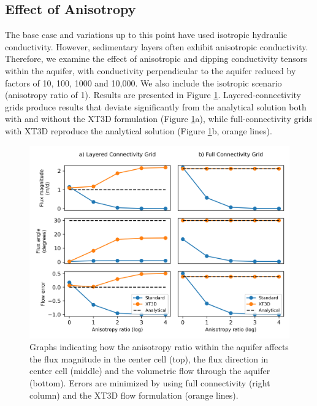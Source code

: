 \documentclass{article}
\begin{document}
\subsection{Effect of Anisotropy}

The base case and variations up to this point have used isotropic hydraulic conductivity. However, sedimentary layers often exhibit anisotropic conductivity. Therefore, we examine the effect of anisotropic and dipping conductivity tensors within the aquifer, with conductivity perpendicular to the aquifer reduced by factors of 10, 100, 1000 and 10,000. We also include the isotropic scenario (anisotropy ratio of 1). Results are presented in Figure \ref{fig:fig5}. Layered-connectivity grids produce results that deviate significantly from the analytical solution both with and without the XT3D formulation (Figure \ref{fig:fig5}a), while full-connectivity grids with XT3D reproduce the analytical solution (Figure \ref{fig:fig5}b, orange lines).

\begin{figure}
	\begin{center}
	\includegraphics[scale=0.9]{../figures/fig5paper.png}
	\caption{Graphs indicating how the anisotropy ratio within the aquifer affects the flux magnitude in the center cell (top), the flux direction in center cell (middle) and the volumetric flow through the aquifer (bottom). Errors are minimized by using full connectivity (right column) and the XT3D flow formulation (orange lines).}
	\label{fig:fig5}
	\end{center}
\end{figure}
\end{document}
